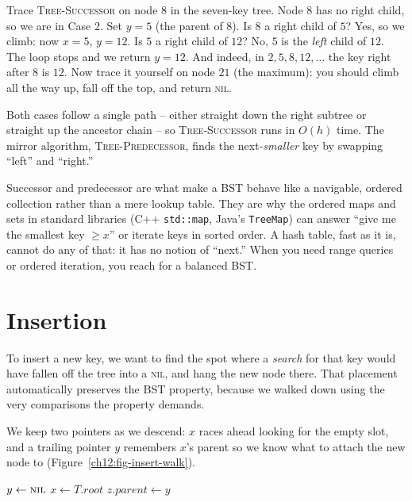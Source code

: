 \begin{labbox}
Trace \textsc{Tree-Successor} on node $8$ in the seven-key tree. Node $8$ has no right child,
so we are in Case 2. Set $y = 5$ (the parent of $8$). Is $8$ a right child of $5$? Yes, so we
climb: now $x = 5$, $y = 12$. Is $5$ a right child of $12$? No, $5$ is the \emph{left} child of
$12$. The loop stops and we return $y = 12$. And indeed, in $2,5,8,12,\ldots$ the key right
after $8$ is $12$. Now trace it yourself on node $21$ (the maximum): you should climb all the
way up, fall off the top, and return \textsc{nil}.
\end{labbox}

Both cases follow a single path -- either straight down the right subtree or straight up the
ancestor chain -- so \textsc{Tree-Successor} runs in $O(h)$ time. The mirror algorithm,
\textsc{Tree-Predecessor}, finds the next-\emph{smaller} key by swapping ``left'' and
``right.''

\begin{aestheticbox}
Successor and predecessor are what make a BST behave like a navigable, ordered collection
rather than a mere lookup table. They are why the ordered maps and sets in standard libraries
(C++ \lstinline|std::map|, Java's \lstinline|TreeMap|) can answer ``give me the smallest key
$\ge x$'' or iterate keys in sorted order. A hash table, fast as it is, cannot do any of that:
it has no notion of ``next.'' When you need range queries or ordered iteration, you reach for
a balanced BST.
\end{aestheticbox}

\section{Insertion}

To insert a new key, we want to find the spot where a \emph{search} for that key would have
fallen off the tree into a \textsc{nil}, and hang the new node there. That placement
automatically preserves the BST property, because we walked down using the very comparisons
the property demands.

We keep two pointers as we descend: $x$ races ahead looking for the empty slot, and a
trailing pointer $y$ remembers $x$'s parent so we know what to attach the new node to (Figure~\ref{ch12:fig-insert-walk}).

\begin{algorithm}[H]
\caption{\textsc{Tree-Insert}($T$, $z$)}
$y \gets \textsc{nil}$\;
$x \gets T.\mathit{root}$\;
$z.\mathit{parent} \gets y$\;
\end{algorithm}

